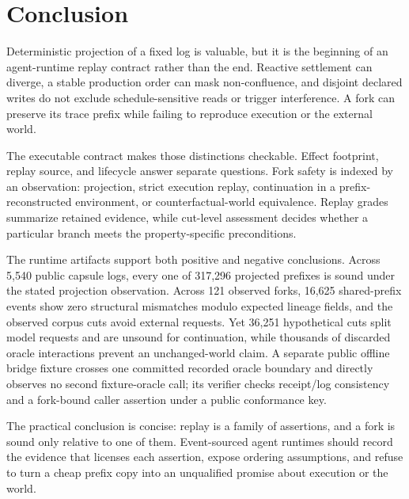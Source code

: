 \section{Conclusion}
\label{sec:conclusion}

Deterministic projection of a fixed log is valuable, but it is the beginning of
an agent-runtime replay contract rather than the end.  Reactive settlement can
diverge, a stable production order can mask non-confluence, and disjoint
declared writes do not exclude schedule-sensitive reads or trigger
interference.  A fork can preserve its trace prefix while failing to reproduce
execution or the external world.

The executable contract makes those distinctions checkable.  Effect
footprint, replay source, and lifecycle answer separate questions.  Fork safety
is indexed by an observation: projection, strict execution replay, continuation
in a prefix-reconstructed environment, or counterfactual-world equivalence.
Replay grades summarize retained evidence, while cut-level assessment decides
whether a particular branch meets the property-specific preconditions.

The runtime artifacts support both positive and negative conclusions.  Across
5,540 public capsule logs, every one of 317,296 projected prefixes is sound
under the stated projection observation.  Across 121 observed forks, 16,625
shared-prefix events show zero structural mismatches modulo expected lineage
fields, and the observed corpus cuts avoid external requests.  Yet 36,251 hypothetical
cuts split model requests and are unsound for continuation, while thousands of
discarded oracle interactions prevent an unchanged-world claim.  A separate
public offline bridge fixture crosses one committed recorded oracle boundary
and directly observes no second fixture-oracle call; its verifier checks
receipt/log consistency and a fork-bound caller assertion under a public
conformance key.

The practical conclusion is concise: replay is a family of assertions, and a
fork is sound only relative to one of them.  Event-sourced agent runtimes should
record the evidence that licenses each assertion, expose ordering assumptions,
and refuse to turn a cheap prefix copy into an unqualified promise about
execution or the world.
